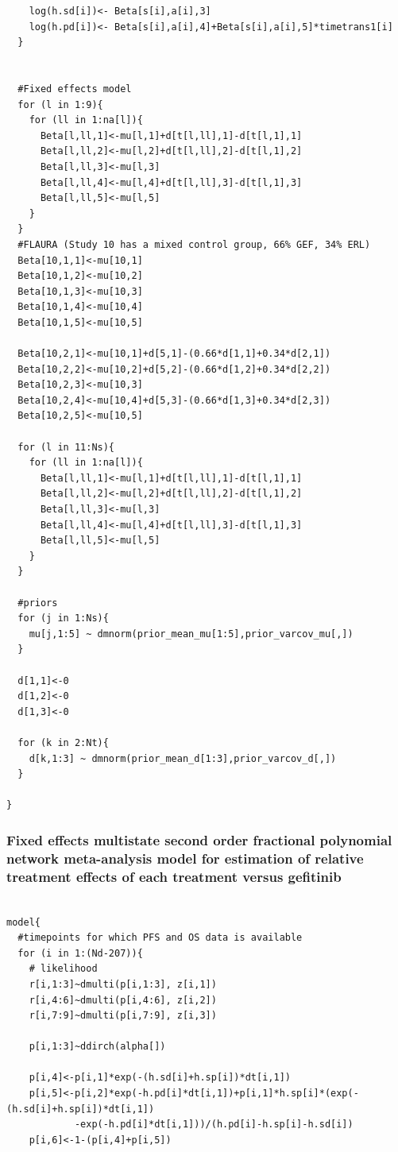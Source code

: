 \documentclass[11pt,final,fleqn]{article}\usepackage[]{graphicx}\usepackage[]{color}
\theoremstyle{plain}
\begin{document}
\begin{appendices}
\begin{verbatim}
    log(h.sd[i])<- Beta[s[i],a[i],3] 
    log(h.pd[i])<- Beta[s[i],a[i],4]+Beta[s[i],a[i],5]*timetrans1[i]
  }
    
 
  #Fixed effects model
  for (l in 1:9){
    for (ll in 1:na[l]){
      Beta[l,ll,1]<-mu[l,1]+d[t[l,ll],1]-d[t[l,1],1]
      Beta[l,ll,2]<-mu[l,2]+d[t[l,ll],2]-d[t[l,1],2]
      Beta[l,ll,3]<-mu[l,3]
      Beta[l,ll,4]<-mu[l,4]+d[t[l,ll],3]-d[t[l,1],3]
      Beta[l,ll,5]<-mu[l,5]
    }
  }
  #FLAURA (Study 10 has a mixed control group, 66% GEF, 34% ERL)
  Beta[10,1,1]<-mu[10,1]
  Beta[10,1,2]<-mu[10,2]
  Beta[10,1,3]<-mu[10,3]
  Beta[10,1,4]<-mu[10,4]
  Beta[10,1,5]<-mu[10,5]
  
  Beta[10,2,1]<-mu[10,1]+d[5,1]-(0.66*d[1,1]+0.34*d[2,1])
  Beta[10,2,2]<-mu[10,2]+d[5,2]-(0.66*d[1,2]+0.34*d[2,2])
  Beta[10,2,3]<-mu[10,3]
  Beta[10,2,4]<-mu[10,4]+d[5,3]-(0.66*d[1,3]+0.34*d[2,3])
  Beta[10,2,5]<-mu[10,5]
  
  for (l in 11:Ns){
    for (ll in 1:na[l]){
      Beta[l,ll,1]<-mu[l,1]+d[t[l,ll],1]-d[t[l,1],1]
      Beta[l,ll,2]<-mu[l,2]+d[t[l,ll],2]-d[t[l,1],2]
      Beta[l,ll,3]<-mu[l,3]
      Beta[l,ll,4]<-mu[l,4]+d[t[l,ll],3]-d[t[l,1],3]
      Beta[l,ll,5]<-mu[l,5]
    }
  }
  
  #priors
  for (j in 1:Ns){
    mu[j,1:5] ~ dmnorm(prior_mean_mu[1:5],prior_varcov_mu[,]) 
  }
  
  d[1,1]<-0
  d[1,2]<-0
  d[1,3]<-0

  for (k in 2:Nt){
    d[k,1:3] ~ dmnorm(prior_mean_d[1:3],prior_varcov_d[,]) 
  }

}

\end{verbatim}

\subsubsection{Fixed effects multistate second order fractional polynomial network meta-analysis model for estimation of relative treatment effects of each treatment versus gefitinib}
\begin{verbatim} 

model{
  #timepoints for which PFS and OS data is available
  for (i in 1:(Nd-207)){
    # likelihood
    r[i,1:3]~dmulti(p[i,1:3], z[i,1]) 
    r[i,4:6]~dmulti(p[i,4:6], z[i,2]) 
    r[i,7:9]~dmulti(p[i,7:9], z[i,3]) 
    
    p[i,1:3]~ddirch(alpha[])
    
    p[i,4]<-p[i,1]*exp(-(h.sd[i]+h.sp[i])*dt[i,1])
    p[i,5]<-p[i,2]*exp(-h.pd[i]*dt[i,1])+p[i,1]*h.sp[i]*(exp(-(h.sd[i]+h.sp[i])*dt[i,1])
    		-exp(-h.pd[i]*dt[i,1]))/(h.pd[i]-h.sp[i]-h.sd[i])
    p[i,6]<-1-(p[i,4]+p[i,5])
    

\end{verbatim}
\end{appendices}
\end{document}
